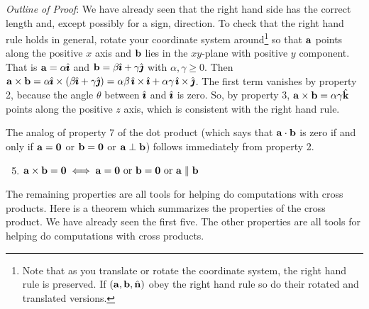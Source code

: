 \begin{enumerate}[(1)]
\textit{Outline of Proof}: We have already seen that the right hand side
has the correct length and, except possibly for a sign, direction.
To check that the right hand rule holds in
general, rotate your coordinate system around\footnote{Note that as you 
translate or rotate the coordinate system, the right hand rule is preserved. 
If $(\mathbf{a},\mathbf{b},\hat{\mathbf{n}})$ obey the right hand rule so do their rotated and 
translated versions.} 
so that $\mathbf{a}$ points along
the positive $x$ axis and $\mathbf{b}$ lies in the $xy$-plane with positive
$y$ component. That is $\mathbf{a}=\alpha\hat{\pmb{\imath}}$ and $\mathbf{b}=\beta\hat{\pmb{\imath}}+\gamma
\hat{\pmb{\jmath}}$ with $\alpha,\gamma\ge 0$. Then 
$\mathbf{a}\times\mathbf{b}=\alpha\hat{\pmb{\imath}}\times(\beta\hat{\pmb{\imath}}+\gamma\hat{\pmb{\jmath}})
=\alpha\beta\,\hat{\pmb{\imath}}\times\hat{\pmb{\imath}}+\alpha\gamma\,\hat{\pmb{\imath}}\times\hat{\pmb{\jmath}}$. The
first term vanishes by property 2, because the angle $\theta$ between $\hat{\pmb{\imath}}$
and $\hat{\pmb{\imath}}$ is zero. So, by property 3, 
$\mathbf{a}\times\mathbf{b}= \alpha\gamma\hat{\mathbf{k}}$ points
along the positive $z$ axis, which is consistent with the right hand rule.

\end{enumerate}

\noindent  The analog of property 7 of the dot product (which says that
$\mathbf{a}\cdot\mathbf{b}$ is zero if and only if  $\mathbf{a}=\mathbf{0}$ or $\mathbf{b}=\mathbf{0}$ or  $\mathbf{a}\perp\mathbf{b}$) follows
immediately from property 2.

\begin{enumerate}[(1)]
\setcounter{enumi}{4}

\item $\mathbf{a}\times\mathbf{b}=\mathbf{0}\iff \mathbf{a}=\mathbf{0} \text{ or }\mathbf{b}=\mathbf{0} 
\text{ or }\mathbf{a}\parallel\mathbf{b}$

\end{enumerate}

\noindent
The remaining properties are all tools for
helping do computations with cross products.
Here is a theorem which summarizes the properties of the cross product.
We have already seen the first five. The other properties are all tools 
for helping do computations with cross products.

